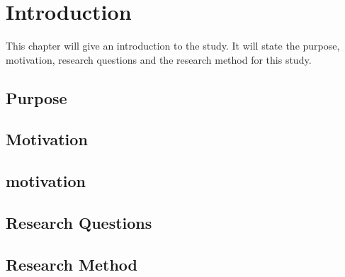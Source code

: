 \chapter{Introduction}
\label{introduction}

This chapter will give an introduction to the study. It will state the purpose, motivation, research questions and the research method for this study. 

\section{Purpose}
\label{purpose}


\section{Motivation}
\section{motivation}


\section{Research Questions}
\label{reseachquestions}


\section{Research Method}
\label{researchmethod}


